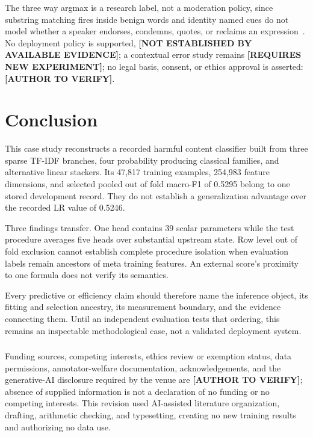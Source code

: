 \documentclass[runningheads]{llncs}
\newcommand{\needexp}{\textbf{[REQUIRES NEW EXPERIMENT]}}
\newcommand{\verifyauthor}{\textbf{[AUTHOR TO VERIFY]}}
\newcommand{\notestablished}{\textbf{[NOT ESTABLISHED BY AVAILABLE EVIDENCE]}}
\begin{document}
The three way argmax is a research label, not a moderation policy, since substring matching fires inside benign words and identity named cues do not model whether a speaker endorses, condemns, quotes, or reclaims an expression~\cite{blodgett2020language,rottger2021hatecheck}. No deployment policy is supported, \notestablished{}; a contextual error study remains \needexp{}; no legal basis, consent, or ethics approval is asserted: \verifyauthor{}.








\section{Conclusion}
\label{sec:conclusion}

This case study reconstructs a recorded harmful content classifier built from three sparse TF-IDF branches, four probability producing classical families, and alternative linear stackers. Its 47,817 training examples, 254,983 feature dimensions, and selected pooled out of fold macro-F1 of 0.5295 belong to one stored development record. They do not establish a generalization advantage over the recorded LR value of 0.5246.

Three findings transfer. One head contains 39 scalar parameters while the test procedure averages five heads over substantial upstream state. Row level out of fold exclusion cannot establish complete procedure isolation when evaluation labels remain ancestors of meta training features. An external score's proximity to one formula does not verify its semantics.

Every predictive or efficiency claim should therefore name the inference object, its fitting and selection ancestry, its measurement boundary, and the evidence connecting them. Until an independent evaluation tests that ordering, this remains an inspectable methodological case, not a validated deployment system.

\begin{credits}
\subsubsection{\discintname}
Funding sources, competing interests, ethics review or exemption status, data
permissions, annotator-welfare documentation, acknowledgements, and the
generative-AI disclosure required by the venue are \verifyauthor; absence of
supplied information is not a declaration of no funding or no competing
interests. This revision used AI-assisted literature organization, drafting,
arithmetic checking, and typesetting, creating no new training results and
authorizing no data use.
\end{credits}



\end{document}
